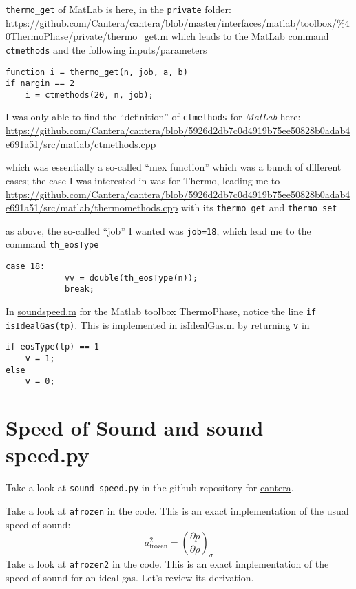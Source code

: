 \documentclass[10pt]{amsart}
\begin{document}
\begin{multicols*}{2}
\verb|thermo_get| of MatLab is here, in the \verb|private| folder:
\url{https://github.com/Cantera/cantera/blob/master/interfaces/matlab/toolbox/%40ThermoPhase/private/thermo_get.m}
which leads to the MatLab command \verb|ctmethods| and the following inputs/parameters
\begin{lstlisting}
function i = thermo_get(n, job, a, b)
if nargin == 2
    i = ctmethods(20, n, job);
\end{lstlisting}

I was only able to find the ``definition'' of \verb|ctmethods| for \emph{MatLab} here:
\url{https://github.com/Cantera/cantera/blob/5926d2db7c0d4919b75ee50828b0adab4e691a51/src/matlab/ctmethods.cpp}

which was essentially a so-called ``mex function'' which was a bunch of different cases; the case I was interested in was for Thermo, leading me to
\url{https://github.com/Cantera/cantera/blob/5926d2db7c0d4919b75ee50828b0adab4e691a51/src/matlab/thermomethods.cpp}
with its \verb|thermo_get| and \verb|thermo_set|

as above, the so-called ``job'' I wanted was \verb|job=18|, which lead me to the command 
\verb|th_eosType|
\begin{lstlisting}
case 18:
            vv = double(th_eosType(n));
            break;
\end{lstlisting}


In \href{https://github.com/Cantera/cantera/blob/master/interfaces/matlab/toolbox/@ThermoPhase/soundspeed.m}{soundspeed.m} for the Matlab toolbox ThermoPhase, notice the line \verb|if isIdealGas(tp)|.  This is implemented in \href{https://github.com/Cantera/cantera/blob/5926d2db7c0d4919b75ee50828b0adab4e691a51/interfaces/matlab/toolbox/%40ThermoPhase/isIdealGas.m}{isIdealGas.m} by returning \verb|v| in 
\begin{lstlisting}
if eosType(tp) == 1
    v = 1;
else
    v = 0;
\end{lstlisting}



\section{Speed of Sound and sound speed.py}

Take a look at \verb|sound_speed.py| in the github repository for \href{https://github.com/Cantera/cantera/blob/master/interfaces/cython/cantera/examples/thermo/sound_speed.py}{cantera}.

Take a look at \verb|afrozen| in the code.  This is an exact implementation of the usual speed of sound:
\[
a^2_{\text{frozen}} = \left( \frac{ \partial p}{ \partial \rho} \right)_{\sigma}
\]
Take a look at \verb|afrozen2| in the code.  This is an exact implementation of the speed of sound for an ideal gas.  Let's review its derivation.  


\end{multicols*}
\end{document}
